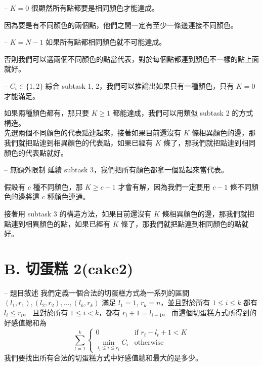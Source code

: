 \documentclass[hyperref,UTF8,notheorems,xcolor={dvipsnames}]{beamer}
\newcommand{\btitle}[1]{{\secname} -- #1}
\theoremstyle{definition}
\begin{document}
\begin{frame}[fragile]{\btitle{$K = 0$}}
	很顯然所有點都要是相同顏色才能達成。 

	因為要是有不同顏色的兩個點，他們之間一定有至少一條邊連接不同顏色。
\end{frame}

\begin{frame}[fragile]{\btitle{$K = N - 1$}}
	如果所有點都相同顏色就不可能達成。 

	否則我們可以選兩個不同顏色的點當代表，對於每個點都連到顏色不一樣的點上面就好。
\end{frame}

\begin{frame}[fragile]{\btitle{$C_i \in \{1, 2\}$}}
	綜合 subtask 1, 2，我們可以推論出如果只有一種顏色，只有 $K = 0$ 才能滿足。
	\pause

	如果兩種顏色都有，那只要 $K \ge 1$ 都能達成，我們可以用類似 subtask 2 的方式構造。 \\
	先選兩個不同顏色的代表點連起來，接著如果目前還沒有 $K$ 條相異顏色的邊，那我們就把點連到相異顏色的代表點，如果已經有 $K$ 條了，那我們就把點連到相同顏色的代表點就好。
\end{frame}

\begin{frame}[fragile]{\btitle{無額外限制}}
	延續 subtask 3，我們把所有顏色都拿一個點起來當代表。 
	\pause

	假設有 $c$ 種不同顏色，那 $K \ge c - 1$ 才會有解，因為我們一定要用 $c - 1$ 條不同顏色的邊將這 $c$ 種顏色連通。
	\pause

	接著用 subtask 3 的構造方法，如果目前還沒有 $K$ 條相異顏色的邊，那我們就把點連到相異顏色的點，如果已經有 $K$ 條了，那我們就把點連到相同顏色的點就好。
\end{frame}

\section{B. 切蛋糕 2(cake2)}

\begin{frame}[fragile]{\btitle{題目敘述}}
	我們定義一個合法的切蛋糕方式為一系列的區間 $(l_1, r_1), (l_2, r_2), ..., (l_k, r_k)$
	滿足 $l_1 = 1$, $r_k = n$，並且對於所有 $1 \le i \le k$ 都有 $l_i \le r_i$。
	且對於所有 $1 \le i < k$，都有 $r_i + 1 =  l_{i + 1}$。
	而這個切蛋糕方式所得到的好感值總和為 
	$$
	\sum_{t = 1}^{k} \begin{cases}
	0 & \text{if  } r_t - l_t + 1 < K \\
	\min \limits_{l_t \le i \le r_t} C_i & \text{otherwise  }
	\end{cases}
	$$
	我們要找出所有合法的切蛋糕方式中好感值總和最大的是多少。
\end{frame}
\end{document}
